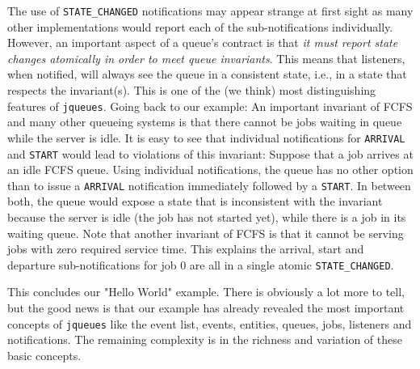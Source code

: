 The use of \lstinline|STATE_CHANGED| notifications may
  appear strange at first sight
  as many other implementations would
  report each of the sub-notifications individually.
However, an important aspect of a queue's contract is that
  {\em it must report state changes atomically
       in order to meet queue invariants}.
This means that listeners,
  when notified,
  will always see the queue in a consistent state,
  i.e., in a state that respects the invariant(s).
This is one of the (we think) most distinguishing features of
  \lstinline|jqueues|.
Going back to our example: An important invariant of FCFS
  and many other queueing systems
  is that there cannot be jobs
  waiting in queue while the server is idle.
It is easy to see that individual notifications for
  \lstinline|ARRIVAL| and \lstinline|START| would
  lead to violations of this invariant:
  Suppose that a job arrives at an idle FCFS queue.
  Using individual notifications,
  the queue has no other option than to
  issue a \lstinline|ARRIVAL|
  notification
  immediately followed by a \lstinline|START|.
In between both, the queue would expose a state
  that is inconsistent with the invariant
  because the server is idle (the job has not started yet),
  while there is a job in its waiting queue.
Note that another invariant of FCFS is that
  it cannot be serving jobs with zero required service time.
This explains the arrival, start and departure sub-notifications
  for job $0$ are all in a single atomic \lstinline|STATE_CHANGED|.
  
This concludes our "Hello World" example.
There is obviously a lot more to tell,
  but the good news is that our example
  has already revealed the most important concepts
  of \lstinline|jqueues| like
  the event list, events, entities, queues, jobs, listeners
  and notifications.
The remaining complexity is in the richness and variation of these
  basic concepts.